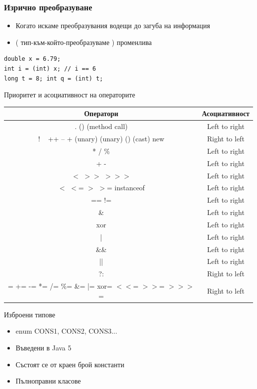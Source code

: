 \documentclass{beamer}
\begin{document}
\begin{frame}[fragile]
  \frametitle{Изрично преобразуване}
  \transdissolve
  \begin{itemize}
  \item Когато искаме преобразувания водещи
    до загуба на информация
  \item ( тип-към-който-преобразуваме ) променлива
  \end{itemize}
  \begin{lstlisting}
double x = 6.79;
int i = (int) x; // i == 6
long t = 8; int q = (int) t;
  \end{lstlisting}
\end{frame}

\begin{frame}{Приоритет и асоциативност на операторите}
  \transdissolve
\small
\begin{tabular}{|c|c|}
  \hline
  Оператори & Асоциативност \\
  \hline
  [] . () (method call) & Left to right \\
  \hline
  ! ~ ++ -- + (unary) (unary) () (cast) new & Right to left \\
  \hline
  * / \% & Left to right \\
  \hline
  + -   & Left to right \\
  \hline
  $<$ $>$$>$ $>$$>$$>$ & Left to right \\
  \hline
  $<$ $<$= $>$ $>$= instanceof & Left to right \\
  \hline
  == != & Left to right \\
  \hline
  \& & Left to right \\
  \hline
  xor & Left to right \\
  \hline
  |                                      & Left to right \\
  \hline
  \&\&                                   &  Left to right \\
  \hline
  ||                                   &  Left to right \\
  \hline
  ?:                                  &   Right to left \\
  \hline
  = += -= *= /= \%= \&= |= xor= $<$$<$= $>$$>$= $>$$>$$>$= & Right to left \\
  \hline
\end{tabular}

\end{frame}

\begin{frame}{Изброени типове}
  \transdissolve
  \begin{itemize}
  \item enum {CONS1, CONS2, CONS3...}
  \item Въведени в Java 5
  \item Състоят се от краен брой константи
  \item Пълноправни класове 
  \end{itemize}
\end{frame}
\end{document}
